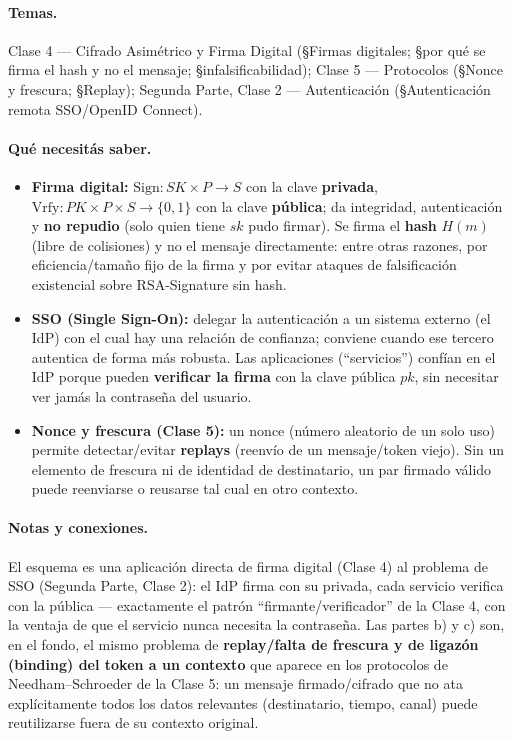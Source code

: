 \paragraph{Temas.}
Clase 4 --- Cifrado Asimétrico y Firma Digital (\S Firmas digitales; \S por qué se firma el
hash y no el mensaje; \S infalsificabilidad); Clase 5 --- Protocolos (\S Nonce y frescura;
\S Replay); Segunda Parte, Clase 2 --- Autenticación (\S Autenticación remota SSO/OpenID
Connect).

\paragraph{Qué necesitás saber.}
\begin{itemize}
  \item \textbf{Firma digital:} $\mathrm{Sign}: SK\times P\to S$ con la clave
  \textbf{privada}, $\mathrm{Vrfy}: PK\times P\times S\to\{0,1\}$ con la clave
  \textbf{pública}; da integridad, autenticación y \textbf{no repudio} (solo quien tiene
  $sk$ pudo firmar). Se firma el \textbf{hash} $H(m)$ (libre de colisiones) y no el mensaje
  directamente: entre otras razones, por eficiencia/tamaño fijo de la firma y por evitar
  ataques de falsificación existencial sobre RSA-Signature sin hash.
  \item \textbf{SSO (Single Sign-On):} delegar la autenticación a un sistema externo (el
  IdP) con el cual hay una relación de confianza; conviene cuando ese tercero autentica de
  forma más robusta. Las aplicaciones (``servicios'') confían en el IdP porque pueden
  \textbf{verificar la firma} con la clave pública $pk$, sin necesitar ver jamás la
  contraseña del usuario.
  \item \textbf{Nonce y frescura (Clase 5):} un nonce (número aleatorio de un solo uso)
  permite detectar/evitar \textbf{replays} (reenvío de un mensaje/token viejo). Sin un
  elemento de frescura ni de identidad de destinatario, un par firmado válido puede
  reenviarse o reusarse tal cual en otro contexto.
\end{itemize}

\paragraph{Notas y conexiones.}
El esquema es una aplicación directa de firma digital (Clase 4) al problema de SSO (Segunda
Parte, Clase 2): el IdP firma con su privada, cada servicio verifica con la pública ---
exactamente el patrón ``firmante/verificador'' de la Clase 4, con la ventaja de que el
servicio nunca necesita la contraseña. Las partes b) y c) son, en el fondo, el mismo problema
de \textbf{replay/falta de frescura y de ligazón (binding) del token a un contexto} que
aparece en los protocolos de Needham--Schroeder de la Clase 5: un mensaje firmado/cifrado que
no ata explícitamente todos los datos relevantes (destinatario, tiempo, canal) puede
reutilizarse fuera de su contexto original.

